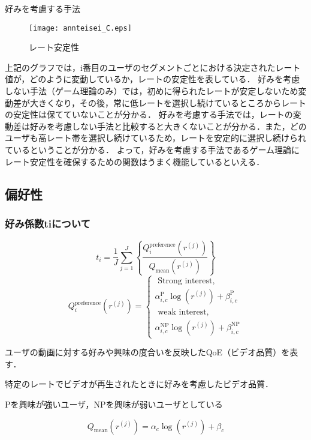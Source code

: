 \documentclass[rinkou,a4paper,uplatex]{ieicej}
\begin{document}
好みを考慮する手法
\begin{figure}[hh]
\centering
\texttt{[image: annteisei\_C.eps]}
\caption{レート安定性}
\end{figure}

上記のグラフでは，i番目のユーザのセグメントごとにおける決定されたレート値が，どのように変動しているか，レートの安定性を表している．
好みを考慮しない手法（ゲーム理論のみ）では，初めに得られたレートが安定しないため変動差が大きくなり，その後，常に低レートを選択し続けているところからレートの安定性は保てていないことが分かる．
好みを考慮する手法では，レートの変動差は好みを考慮しない手法と比較すると大きくないことが分かる．また，どのユーザも高レート帯を選択し続けているため，レートを安定的に選択し続けられているということが分かる．
よって，好みを考慮する手法であるゲーム理論にレート安定性を確保するための関数はうまく機能しているといえる．

\subsection{偏好性}
\subsubsection{好み係数tiについて}
\begin{equation}
t_i=\frac{1}{J}\sum_{j=1}^{J}\left\{\frac{Q^{\text{preference}}_i(r^{(j)})}{Q_{\text{mean}}(r^{(j)})}\right\}
\end{equation}
\begin{equation}
Q^{\text{preference}}_i(r^{(j)}) =
\begin{cases} 
    \text{ Strong interest}, \\
    \alpha^{\text{P}}_{i,c} \log(r^{(j)}) + \beta^{\text{P}}_{i,c} \\
    \text{ weak interest}, \\
    \alpha^{\text{NP}}_{i,c} \log(r^{(j)}) + \beta^{\text{NP}}_{i,c}
\end{cases}
\end{equation}

ユーザの動画に対する好みや興味の度合いを反映したQoE（ビデオ品質）を表す．

特定のレートでビデオが再生されたときに好みを考慮したビデオ品質．

Pを興味が強いユーザ，NPを興味が弱いユーザとしている

\begin{equation}
Q_{\text{mean}}(r^{(j)}) = \alpha_c \log(r^{(j)}) + \beta_c
\end{equation}
\end{document}
